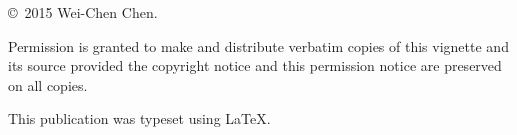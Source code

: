 
\null
\vfill
\copyright\ 2015 Wei-Chen Chen.

Permission is granted to make and distribute verbatim copies of
this vignette and its source provided the copyright notice and
this permission notice are preserved on all copies.

This publication was typeset using \LaTeX.
